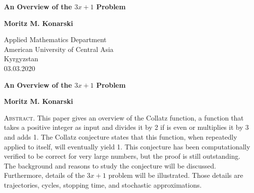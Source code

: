 \documentclass[12pt,a4paper,reqno]{amsart}
\begin{document}
\begin{titlepage}
    \begin{center}
        \vspace*{1cm}
            
        \Huge
        \textbf{An Overview of the $3x+1$ Problem}
            
        \vspace{0.5cm}
            
        \vspace{1.5cm}
            
        \LARGE
        \textbf{Moritz M. Konarski}
            
        \vfill
            
            
        \vspace{0.8cm}
            
            
        \Large
        Applied Mathematics Department\\
        American University of Central Asia\\
        Kyrgyzstan\\
        03.03.2020
            
    \end{center}
\end{titlepage}

\thispagestyle{plain}
\begin{center}
    \Large
    \textbf{An Overview of the $3x+1$ Problem}
        
    \vspace{0.4cm}
    \large
        
    \vspace{0.4cm}
    \textbf{Moritz M. Konarski}
       
    \vspace{0.9cm}
\end{center}
    \textsc{Abstract.} This paper gives an overview of the Collatz function, a 
    function that takes
    a positive integer as input and divides it by 2 if is even or multiplies
    it by 3 and adds 1. The Collatz conjecture states that this function, when
    repeatedly applied to itself, will eventually yield 1. This conjecture has
    been computationally verified to be correct for very large numbers, but the
    proof is still outstanding. The background and reasons to study the
    conjecture will be discussed. Furthermore, details of the $3x+1$ problem
    will be illustrated. Those details are trajectories, cycles, stopping time,
    and stochastic approximations. 
\end{document}
